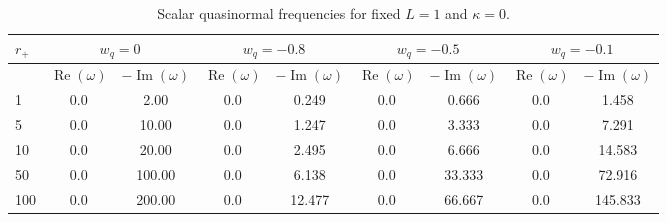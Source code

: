 \documentclass[preprint]{revtex4-1}
\renewcommand{\Re}{\operatorname{Re}}
\renewcommand{\Im}{\operatorname{Im}}
\begin{document}
\begin{table}[htbp]
\centering
  \begin{tabular}{lSSSSSSSS}
    \hline
     &
       &
       &
       &
      \\
      \midrule
      & {$\Re(\omega)$} & {$-\Im(\omega)$} & {$\Re(\omega)$} & {$-\Im(\omega)$} & {$\Re(\omega)$} & {$-\Im(\omega)$} & {$\Re(\omega)$} & {$-\Im(\omega)$} \\
      	& 0.0	& 2.00		& 0.0	& 0.249 	& 0.0	& 0.666	& 0.0	& 1.458	\\
    5	& 0.0	& 10.00		& 0.0	& 1.247		& 0.0	& 3.333 & 0.0	& 7.291		\\
    10	& 0.0	& 20.00		& 0.0	& 2.495		& 0.0	& 6.666 & 0.0	& 14.583		\\
    50	& 0.0	& 100.00	& 0.0	& 6.138		& 0.0	& 33.333& 0.0	& 72.916	\\
    100 & 0.0	& 200.00	& 0.0	& 12.477	& 0.0	& 66.667& 0.0	& 145.833	\\
    \hline
  \end{tabular}
   \caption{Scalar quasinormal frequencies for fixed $L=1$ and $\kappa=0$.}\label{scalar_qnm__k_0_hh}
\end{table}
\end{document}
